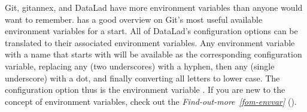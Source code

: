 \ignorespaces 
\sphinxAtStartPar
Git, git\sphinxhyphen{}annex, and DataLad have more environment variables than anyone would want to
remember. 
has a good overview on Git’s most useful available environment variables for a start.
All of DataLad’s configuration options can be translated to their
associated environment variables. Any environment variable with a name that starts with 
will be available as the corresponding  configuration variable,
replacing any \sphinxcode{\sphinxupquote{\_\_}} (two underscores) with a hyphen, then any \sphinxcode{\sphinxupquote{\_}} (single underscore)
with a dot, and finally converting all letters to lower case. The 
configuration option thus is the environment variable .
If you are new to the concept of environment variables, check out the
\textit{Find-out-more}~{\findoutmoreiconinline}\textit{\ref{fom-envvar}} {\hyperref[\detokenize{basics/101-123-config2:fom-envvar}]{}} ().

